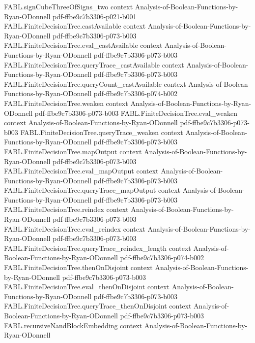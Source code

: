 \begin{theorem}
  {FABL.signCubeThreeOfSigns_two}
  {context}
  {Analysis-of-Boolean-Functions-by-Ryan-ODonnell}
  {pdf-ffbe9c7b3306-p021-b001}
\proofstep
  {FABL.FiniteDecisionTree.castAvailable}
  {context}
  {Analysis-of-Boolean-Functions-by-Ryan-ODonnell}
  {pdf-ffbe9c7b3306-p073-b003}
\proofstep
  {FABL.FiniteDecisionTree.eval_castAvailable}
  {context}
  {Analysis-of-Boolean-Functions-by-Ryan-ODonnell}
  {pdf-ffbe9c7b3306-p073-b003}
\proofstep
  {FABL.FiniteDecisionTree.queryTrace_castAvailable}
  {context}
  {Analysis-of-Boolean-Functions-by-Ryan-ODonnell}
  {pdf-ffbe9c7b3306-p073-b003}
\proofstep
  {FABL.FiniteDecisionTree.queryCount_castAvailable}
  {context}
  {Analysis-of-Boolean-Functions-by-Ryan-ODonnell}
  {pdf-ffbe9c7b3306-p074-b002}
\proofstep
  {FABL.FiniteDecisionTree.weaken}
  {context}
  {Analysis-of-Boolean-Functions-by-Ryan-ODonnell}
  {pdf-ffbe9c7b3306-p073-b003}
\proofstep
  {FABL.FiniteDecisionTree.eval_weaken}
  {context}
  {Analysis-of-Boolean-Functions-by-Ryan-ODonnell}
  {pdf-ffbe9c7b3306-p073-b003}
\proofstep
  {FABL.FiniteDecisionTree.queryTrace_weaken}
  {context}
  {Analysis-of-Boolean-Functions-by-Ryan-ODonnell}
  {pdf-ffbe9c7b3306-p073-b003}
\proofstep
  {FABL.FiniteDecisionTree.mapOutput}
  {context}
  {Analysis-of-Boolean-Functions-by-Ryan-ODonnell}
  {pdf-ffbe9c7b3306-p073-b003}
\proofstep
  {FABL.FiniteDecisionTree.eval_mapOutput}
  {context}
  {Analysis-of-Boolean-Functions-by-Ryan-ODonnell}
  {pdf-ffbe9c7b3306-p073-b003}
\proofstep
  {FABL.FiniteDecisionTree.queryTrace_mapOutput}
  {context}
  {Analysis-of-Boolean-Functions-by-Ryan-ODonnell}
  {pdf-ffbe9c7b3306-p073-b003}
\proofstep
  {FABL.FiniteDecisionTree.reindex}
  {context}
  {Analysis-of-Boolean-Functions-by-Ryan-ODonnell}
  {pdf-ffbe9c7b3306-p073-b003}
\proofstep
  {FABL.FiniteDecisionTree.eval_reindex}
  {context}
  {Analysis-of-Boolean-Functions-by-Ryan-ODonnell}
  {pdf-ffbe9c7b3306-p073-b003}
\proofstep
  {FABL.FiniteDecisionTree.queryTrace_reindex_length}
  {context}
  {Analysis-of-Boolean-Functions-by-Ryan-ODonnell}
  {pdf-ffbe9c7b3306-p074-b002}
\proofstep
  {FABL.FiniteDecisionTree.thenOnDisjoint}
  {context}
  {Analysis-of-Boolean-Functions-by-Ryan-ODonnell}
  {pdf-ffbe9c7b3306-p073-b003}
\proofstep
  {FABL.FiniteDecisionTree.eval_thenOnDisjoint}
  {context}
  {Analysis-of-Boolean-Functions-by-Ryan-ODonnell}
  {pdf-ffbe9c7b3306-p073-b003}
\proofstep
  {FABL.FiniteDecisionTree.queryTrace_thenOnDisjoint}
  {context}
  {Analysis-of-Boolean-Functions-by-Ryan-ODonnell}
  {pdf-ffbe9c7b3306-p073-b003}
\proofstep
  {FABL.recursiveNandBlockEmbedding}
  {context}
  {Analysis-of-Boolean-Functions-by-Ryan-ODonnell}

\end{theorem}
